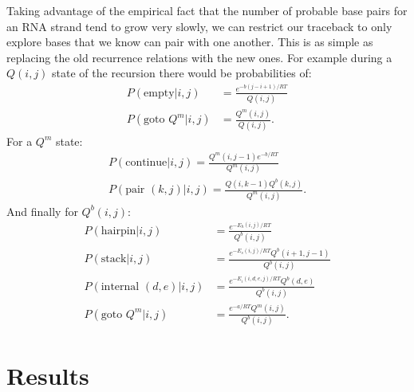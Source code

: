 Taking advantage of the empirical fact that the number of probable
base pairs for an RNA strand tend to grow very slowly, we can restrict
our traceback to only explore bases that we know can pair with one
another. This is as simple as replacing the old recurrence relations
with the new ones. For example during a $Q(i,j)$ state of the
recursion there would be probabilities of:
\begin{align}
P(\text{empty} | i, j) &= \frac{e^{-b(j-i+1)/RT}}{Q(i,j)}\\
P(\text{goto } Q^m | i, j) &= \frac{Q^m(i, j) }{Q(i, j) }.
\end{align}
For a $Q^m$ state:
\begin{align}
P(\text{continue} | i, j) = \frac{Q^m(i, j -1) e^{-b/RT}} {Q^m(i, j) }\\
P(\text{pair } (k, j) | i, j) = \frac{Q(i, k - 1) Q^b(k, j) } {Q^m(i,j) }.
\end{align}
And finally for $Q^b(i, j)$:
\begin{align}
P(\text{hairpin} | i, j) &= \frac{ e^{-E_h(i,j)/RT} } { Q^b(i,j) } \\
P(\text{stack} | i, j ) &= \frac{ e^{-E_s(i,j)/RT} Q^b(i+1, j-1) } {Q^b(i,j)}  \\
P(\text{internal } (d, e) | i, j) &= \frac{e^{-E_i(i, d, e, j)/RT} Q^b(d,e)}{Q^b(i,j) }\\
P(\text{goto } Q^m |i, j ) &= \frac{ e^{-a/RT} Q^m(i,j) } { Q^b(i,j)}. 
\end{align}


\section{Results} 

